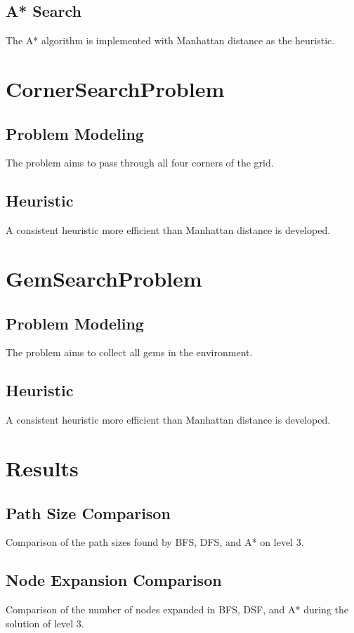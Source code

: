 \documentclass{article}
\begin{document}
\subsection{A* Search}
The A* algorithm is implemented with Manhattan distance as the heuristic.

\section{CornerSearchProblem}

\subsection{Problem Modeling}
The problem aims to pass through all four corners of the grid.

\subsection{Heuristic}
A consistent heuristic more efficient than Manhattan distance is developed.

\section{GemSearchProblem}

\subsection{Problem Modeling}
The problem aims to collect all gems in the environment.

\subsection{Heuristic}
A consistent heuristic more efficient than Manhattan distance is developed.

\section{Results}
\subsection{Path Size Comparison}
Comparison of the path sizes found by BFS, DFS, and A* on level 3.

\subsection{Node Expansion Comparison}
Comparison of the number of nodes expanded in BFS, DSF, and A* during the solution of level 3.
\end{document}
